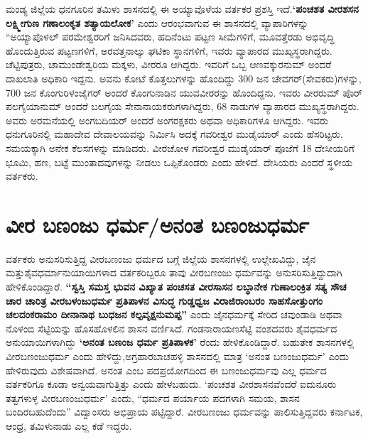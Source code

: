 ಮಂಡ್ಯ ಜಿಲ್ಲೆಯ ಧನಗೂರಿನ ತಮಿಳು ಶಾಸನದಲ್ಲಿ ಈ ಅಯ್ಯಾವೊಳೆಯ ವರ್ತಕರ ಪ್ರಶಸ್ತಿ ಇದೆ.\break \textbf{‘ಪಂಚಶತ ವೀರಶಸನ ಲಕ್ಷ್ಮೀಗುಣ ಗಣಾಲಂಕೃತ ಶತ್ಯಾಯಲೋಕ’} ಎಂದು ಆರಂಭವಾಗುವ ಈ ಶಾಸನದಲ್ಲಿ ವ್ಯಾಪಾರಿಗಳನ್ನು “ಅಯ್ಯಾಪೊಳಲ್​ ಪರಮೇಶ್ವರರಿಗೆ ಜನಿಸಿದವರು, ಹದಿನೆಂಟು ಪಟ್ಟಣ ಸೀಮೆಗಳಿಗೆ, ಮೂವತ್ತೆರಡು ಅಭಿವೃದ್ಧಿ ಹೊಂದುತ್ತಿರುವ ಪಟ್ಟಣಗಳಿಗೆ, ಅರವತ್ತನಾಲ್ಕು ಘಟಿಕಾ ಸ್ಥಾನಗಳಿಗೆ, ಇವರು ವ್ಯಾಪಾರದ ಮುಖ್ಯಸ್ಥರಾಗಿದ್ದರು. ಚೆಟ್ಟಿಪುತ್ರರು, ಚಾಮುಂಡೇಶ್ವರಿಯ ಮಕ್ಕಳು, ವೀರರೂ ಆಗಿದ್ದರು. ಇವರಿಗೆ ಒಬ್ಬ ಆಣವಕ್ಕುರನುಮ್ ಅಂದರೆ ದಾಖಲಾತಿ ಅಧಿಕಾರಿ ಇದ್ದನು. ಅವನು ಕೋಟೆ ಕೊತ್ತಲುಗಳನ್ನು ಹೊಂದಿದ್ದು 300 ಜನ ಚೇವಗರ್​(ಸೇವಕರು)ಗಳನ್ನು, 700 ಜನ ಕೊಂಗುರಿಳಂಜೈಗರ್​ ಅಂದರೆ ಕೊಂಗುನಾಡಿನ ಯುವವೀರರನ್ನು ಹೊಂದಿದ್ದನು. ಇವರು ವೀರರುಮ್ ಪೊರ್​ಪಲಗೈಯಾನುಮ್ ಅಂದರೆ ಬಲಗೈಯ ಸೇನಾನಾಯಕರುಗಳಾಗಿದ್ದರು, 68 ನಾಡುಗಳ ವ್ಯಾಪಾರದ ಮುಖ್ಯಸ್ಥರಾಗಿದ್ದರು. ಅವರು ಅರಮನೆಯಲ್ಲಿ ಅಂಗಬದಿಯರ್​ ಅಂದರೆ ಅಂಗರಕ್ಷಕರು ಅಥವಾ ಅಧಿಕಾರಿಗಳೂ ಆಗಿದ್ದರು. ಇವರು ಧನುಗೂರಿನಲ್ಲಿ ಮಹಾದೇವ ದೇವಾಲಯವನ್ನು ನಿರ್ಮಿಸಿ ಅದಕ್ಕೆ ಗವರೀಶ್ವರ ಮುಡೈಯಾರ್​ ಎಂದು ಹೆಸರಿಟ್ಟರು. ಸಮಯಕ್ಕಾಗಿ ಅನೇಕ ಕೆಲಸಗಳನ್ನು ಮಾಡಿದರು. ವೀರಚೋಳ ಗವರೀಶ್ವರ ಮುಡೈಯಾರ್​ ಪೂಜೆಗೆ 18 ದೇಸೀಯರಿಗೆ ಭೂಮಿ, ಹಣ, ಬಟ್ಟೆ ಮುಂತಾದವುಗಳನ್ನು ನೀಡಲು ಒಪ್ಪಿಕೊಂಡರು ಎಂದು ಹೇಳಿದೆ. ದೇಸಿಯರು ಎಂದರೆ ಸ್ಥಳೀಯ ವರ್ತಕರು.


\section{ವೀರ ಬಣಂಜು ಧರ್ಮ/ಅನಂತ ಬಣಂಜುಧರ್ಮ}

ವರ್ತಕರು ಅನುಸರಿಸುತ್ತಿದ್ದ ವೀರಬಣಂಜು ಧರ್ಮದ ಬಗ್ಗೆ ಜಿಲ್ಲೆಯ ಶಾಸನಗಳಲ್ಲಿ ಉಲ್ಲೇಖವಿದ್ದು, ಜೈನ ಮತ್ತು\break ಶೈವಧರ್ಮಾನುಯಾಯಿಗಳಾದ ವರ್ತಕರಿಬ್ಬರೂ ತಾವು ವೀರಬಣಂಜು ಧರ್ಮವನ್ನು ಅನುಸರಿಸುತ್ತಿದ್ದುದಾಗಿ ಹೇಳಿಕೊಂಡಿದ್ದಾರೆ. \textbf{“ಸ್ವಸ್ತಿ ಸಮಸ್ತ ಭುವನ ವಿಖ್ಯಾತ ಪಂಚಸತ ವೀರಸಾಸನ ಲಬ್ಧಾನೇಕ ಗುಣಾಲಂಕ್ರಿತ ಸತ್ಯ ಸೌಚ ಚಾರ ಚಾರಿತ್ರ ವೀರಬಳಂಜುಧರ್ಮ ಪ್ರತಿಪಾಳನ ವಿಸುದ್ಧ ಗುಡ್ಡಧ್ವಜ ವಿರಾಜಿರಾಂಬರಂ ಸಾಹಸೋತ್ತುಂಗಂ ಚಲದಂಕರಾಮಂ ದೀನಾನಾಥ ಬುಧಜನ\general{\break } ಕಲ್ಪವೃಕ್ಷನುಮಪ್ಪ”} ಎಂದು ಜೈನಧರ್ಮಕ್ಕೆ ಸೇರಿದ ಚವುಂಡಾಡಿ ಅಥವಾ ನೊಳಂಬಿ ಸೆಟ್ಟಿಯನ್ನು ಹೊಸಹೊಳಲಿನ ಶಾಸನ ವರ್ಣಿಸಿದೆ. ಗಂಡನಾರಾಯಣಸೆಟ್ಟಿ ವಂಶದವರು ಶೈವಧರ್ಮದ ಅನುಯಾಯಿಗಳಾಗಿದ್ದು \textbf{‘ಅನಂತ ಬಣಂಜ ಧರ್ಮ ಪ್ರತಿಪಾಳಕ’} ರೆಂದು ಹೇಳಿಕೊಂಡಿದ್ದಾರೆ. ಬಹುತೇಕ ಶಾಸನಗಳಲ್ಲಿ ವೀರಬಣಂಜುಧರ್ಮ ಎಂದು ಹೇಳಿದ್ದು,\break ಅಗ್ರಹಾರಬಾಚಹಳ್ಳಿ ಶಾಸನದಲ್ಲಿ ಮಾತ್ರ ‘ಅನಂತ ಬಣಂಜುಧರ್ಮ’ ಎಂದು ಹೇಳಿರುವುದು ವಿಶೇಷವಾಗಿದೆ. ಅನಂತ ಎಂಬ ಪದಪ್ರಯೋಗದಿಂದ ಈ ಬಣಂಜುಧರ್ಮವು ಎಲ್ಲ ಧರ್ಮದ ವರ್ತಕರಿಗೂ ಕೂಡಾ ಅನ್ವಯವಾಗುತ್ತಿತ್ತು ಎಂದು ಹೇಳಬಹುದು. ‘ಪಂಚಶತ ವೀರಶಾಸನವೆಂದರೆ ಐದುನೂರು ತತ್ವಗಳುಳ್ಳ ವೀರಬಣಂಜುಧರ್ಮ’ ಎಂದು, “ಧರ್ಮದ ಪರ್ಯಾಯ ಪದಗಳಾಗಿ ಸಮಯ, ಶಾಸನ ಬಂದಿರಬಹುದೆಂದು” ವಿದ್ವಾಂಸರು ಅಭಿಪ್ರಾಯ ಪಟ್ಟಿದ್ದಾರೆ. ವೀರಬಣಂಜು ಧರ್ಮವನ್ನು ಪಾಲಿಸುತ್ತಿದ್ದವರು ಕರ್ನಾಟಕ, ಆಂಧ್ರ, ತಮಿಳುನಾಡು ಎಲ್ಲ ಕಡೆ ಇದ್ದರು.


